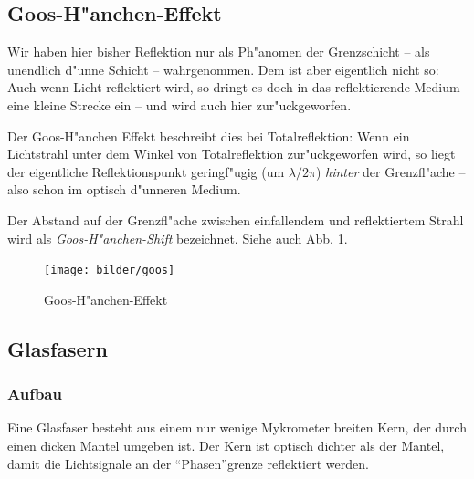 \documentclass[twoside,a4paper]{book}
\begin{document}
%







\subsection{Goos-H"anchen-Effekt}
\label{kap_goos-hanchen-effekt}

Wir haben hier bisher Reflektion nur als Ph"anomen der Grenzschicht --
als unendlich d"unne Schicht -- wahrgenommen. Dem ist aber eigentlich
nicht so: Auch wenn Licht reflektiert wird, so dringt es doch in das
reflektierende Medium eine kleine Strecke ein -- und wird auch hier
zur"uckgeworfen. 

Der Goos-H"anchen Effekt beschreibt dies
bei Totalreflektion: Wenn ein Lichtstrahl unter dem Winkel von
Totalreflektion zur"uckgeworfen wird, so liegt der eigentliche
Reflektionspunkt geringf"ugig (um $\lambda / 2\pi$) \emph{hinter} der
Grenzfl"ache -- also schon im optisch d"unneren Medium.

Der Abstand auf der Grenzfl"ache zwischen einfallendem und
reflektiertem Strahl wird als \emph{Goos-H"anchen-Shift}
bezeichnet. Siehe auch Abb. \ref{abb_goos-haenchen}.


\begin{figure}[h]
   \centering
   \texttt{[image: bilder/goos]}
   \caption{Goos-H"anchen-Effekt}
   \label{abb_goos-haenchen}
\end{figure}












\subsection{Glasfasern}
\label{kap_glasfasern}



\subsubsection{Aufbau}
\label{kap_aufbau}

Eine Glasfaser besteht aus einem nur wenige Mykrometer breiten Kern,
der durch einen dicken Mantel umgeben ist. Der Kern ist optisch
dichter als der Mantel, damit die Lichtsignale an der "`Phasen"'grenze
reflektiert werden.
\end{document}
